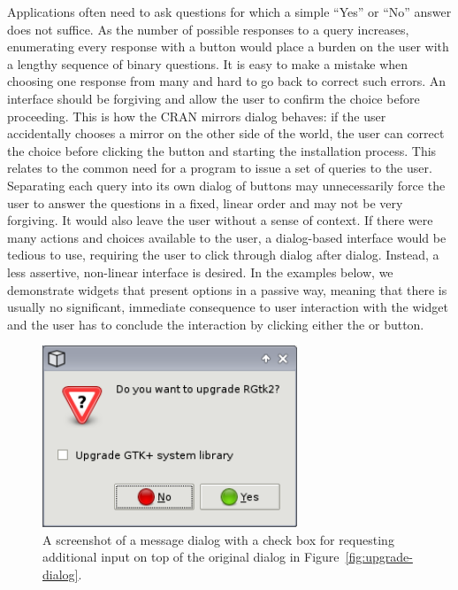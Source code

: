 \documentclass[article,shortnames]{jss}
\begin{document}

Applications often need to ask questions for which a simple ``Yes'' or
``No'' answer does not suffice. As the number of possible responses to
a query increases, enumerating every response with a button would
place a burden on the user with a lengthy sequence of binary
questions.  It is easy to make a mistake when choosing one response
from many and hard to go back to correct such errors. An interface
should be forgiving and allow the user to confirm the choice before
proceeding.  This is how the CRAN mirrors dialog behaves: if the user
accidentally chooses a mirror on the other side of the world, the user
can correct the choice before clicking the  button and
starting the installation process. This relates to the common need for
a program to issue a set of queries to the user. Separating each query
into its own dialog of buttons may unnecessarily force the user to
answer the questions in a fixed, linear order and may not be very
forgiving. It would also leave the user without a sense of context. If
there were many actions and choices available to the user, a
dialog-based interface would be tedious to use, requiring the user to
click through dialog after dialog. Instead, a less assertive,
non-linear interface is desired. In the examples below, we demonstrate
widgets that present options in a passive way, meaning that there is
usually no significant, immediate consequence to user interaction with
the widget and the user has to conclude the interaction by clicking
either the  or  button.

\begin{figure}[tbp]
  \begin{center}
    \includegraphics[width=3in]{checkbox-dialog.png}
    \caption{\label{fig:checkbox-dialog}A screenshot of a message
dialog
      with a 
      check box for requesting additional input on top of the
      original dialog in Figure~\ref{fig:upgrade-dialog}.}
  \end{center}
\end{figure}
\end{document}
